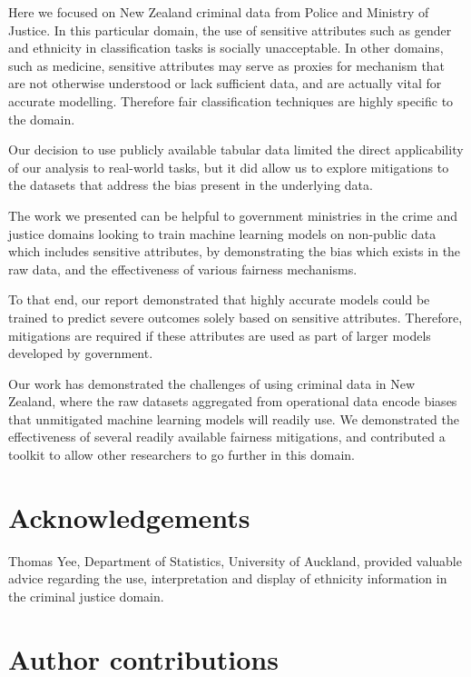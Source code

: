 \documentclass[runningheads]{llncs}
\begin{document}
Here we focused on New Zealand criminal data from Police and Ministry
of Justice. In this particular domain, the use of sensitive attributes
such as gender and ethnicity in classification tasks is socially
unacceptable. In other domains, such as medicine, sensitive attributes
may serve as proxies for mechanism that are not otherwise understood
or lack sufficient data, and are actually vital for accurate
modelling. Therefore fair classification techniques are highly
specific to the domain.

Our decision to use publicly available tabular data limited the direct
applicability of our analysis to real-world tasks, but it did allow us
to explore mitigations to the datasets that address the bias present
in the underlying data.

The work we presented can be helpful to government ministries in the
crime and justice domains looking to train machine learning models on
non-public data which includes sensitive attributes, by demonstrating
the bias which exists in the raw data, and the effectiveness of
various fairness mechanisms.

To that end, our report demonstrated that highly accurate models could
be trained to predict severe outcomes solely based on sensitive
attributes. Therefore, mitigations are required if these attributes are
used as part of larger models developed by government.

Our work has demonstrated the challenges of using criminal data in New
Zealand, where the raw datasets aggregated from operational data
encode biases that unmitigated machine learning models will readily
use. We demonstrated the effectiveness of several readily available
fairness mitigations, and contributed a toolkit to allow other
researchers to go further in this domain.

\section{Acknowledgements}
\label{sec:acknowledgements}
Thomas Yee, Department of Statistics, University of Auckland, provided
valuable advice regarding the use, interpretation and display of
ethnicity information in the criminal justice domain.

\section{Author contributions}
\label{sec:author-contributions}
\end{document}
